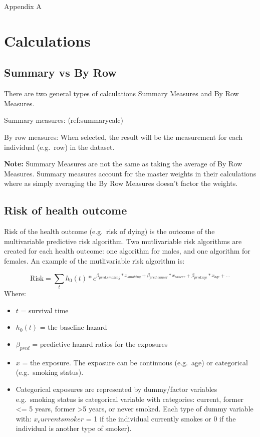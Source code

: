 \documentclass[]{book}
\begin{document}
Appendix A

\section{Calculations}\label{calculations}

\subsection{Summary vs By Row}\label{summary-vs-by-row}

There are two general types of calculations Summary Measures and By Row
Measures.

Summary measures: (ref:summarycalc)

By row measures: When selected, the result will be the measurement for
each individual (e.g.~row) in the dataset.

\textbf{Note:} Summary Measures are not the same as taking the average
of By Row Measures. Summary measures account for the master weights in
their calculations where as simply averaging the By Row Measures doesn't
factor the weights.

\subsection{Risk of health outcome}\label{risk-of-health-outcome}

Risk of the health outcome (e.g.~risk of dying) is the outcome of the
multivariable predictive risk algorithm. Two mutlivariable risk
algorithms are created for each health outcome: one algorithm for males,
and one algorithm for females. An example of the mutlivariable risk
algorithm is:

\[ \text{Risk} = \sum_t h_0(t) * e^{\beta_{pred.smoking}*x_{smoking}+\beta_{pred.cancer}*x_{cancer} + \beta_{pred.age}*x_{age} +...}  \]
Where:

\begin{itemize}
\item
  \(t\) = survival time
\item
  \(h_0(t)\) = the baseline hazard
\item
  \(\beta_{pred}\) = predictive hazard ratios for the exposures
\item
  \(x\) = the exposure. The exposure can be continuous (e.g.~age) or
  categorical (e.g.~smoking status).
\item
  Categorical exposures are represented by dummy/factor variables
  e.g.~smoking status is categorical variable with categories: current,
  former \textless{}= 5 years, former \textgreater{}5 years, or never
  smoked. Each type of dummy variable with: \(x_current smoker\) = 1 if
  the individual currently smokes or 0 if the individual is another type
  of smoker).
\end{itemize}
\end{document}
